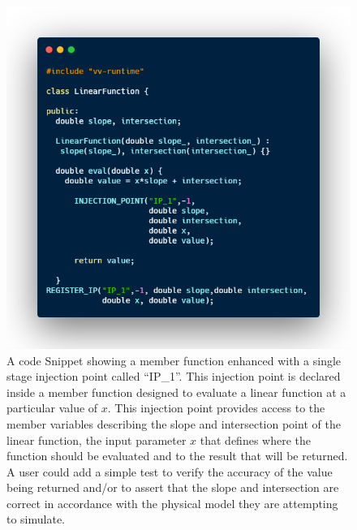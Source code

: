 \begin{figure}
 \includegraphics[width=\textwidth]{./Figures/linear-func.png}
 \caption{A code Snippet showing a member function enhanced with a single stage injection point called ``IP\_1''. This injection point is declared inside a member function 
 designed to evaluate a linear function at a particular value of $x$. This injection point provides access to the member variables describing the slope and intersection point
 of the linear function, the input parameter $x$ that defines where the function should be evaluated and to the result that will be returned. A user could add a simple test to 
 verify the accuracy of the value being returned and/or to assert that the slope and intersection are correct in accordance with the physical model they are attempting to simulate. 
 \label{ip_example}}
\end{figure}

